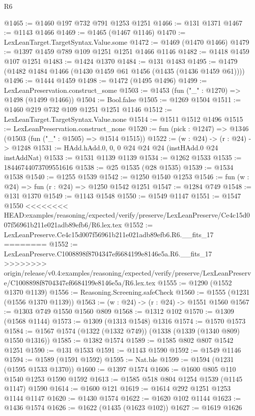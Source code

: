 \begin{lexlean}{R6}
\begin{coremodule}
{{{{{{{{{{{{{{{{{{{{{{{{{{{{{{{{{{{{{{{{{{{{{{{{{{{{{{{{{{{{{@1465 := @1460 @197 @732 @791 @1253 @1251
@1466 := @131 @1371
@1467 := @1143 @1466
@1469 := @1465 (@1467 @1146)
@1470 := LexLeanTarget.TargetSyntax.Value.some
@1472 := @1469 (@1470 @1466)
@1479 := @1397 @1459 @789 @109 @1251 @1251 @1466 @1146
@1482 := @1418 @1459 @107 @1251
@1483 := @1424 @1370
@1484 := @131 @1483
@1495 := @1479 (@1482 @1484 @1466 (@1430 @1459 @61 @1456 (@1435 (@1436 @1459 @61))))
@1496 := @1444 @1459
@1498 := @1472 (@1495 @1496)
@1499 := LexLeanPreservation.construct_some
@1503 := @1453 (fun ("_" : @1270) => @1498 (@1499 @1466))
@1504 := Bool.false
@1505 := @1269 @1504
@1511 := @1460 @219 @732 @109 @1251 @1251 @1146
@1512 := LexLeanTarget.TargetSyntax.Value.none
@1514 := @1511 @1512 @1496
@1515 := LexLeanPreservation.construct_none
@1520 := fun (pick : @1247) => @1346 (@1503 (fun ("_" : @1505) => @1514 @1515))
@1522 := (w : @24) -> (r : @24) -> @1248
@1531 := HAdd.hAdd.{0, 0, 0} @24 @24 @24 (instHAdd.{0} @24 instAddNat)
@1533 := @1531 @1139 @1139
@1534 := @1262 @1533
@1535 := 18446744073709551616
@1538 := @25 @1535 (@28 @1535)
@1539 := @1534 @1538
@1540 := @1255 @1539
@1542 := @1250 @1540 @1253
@1546 := fun (w : @24) => fun (r : @24) => @1250 @1542 @1251
@1547 := @1284 @749
@1548 := @131 @1370
@1549 := @1143 @1548
@1550 := @1549 @1147
@1551 := @1547 @1550
<<<<<<<< HEAD:examples/reasoning/expected/verify/preserve/LexLeanPreserve/Ce4c15d007f56961b211e021adb89efb6/R6.lex.tex
@1552 := LexLeanPreserve.Ce4c15d007f56961b211e021adb89efb6.R6.__fits_17
========
@1552 := LexLeanPreserve.C1008898f8704347ef6684199e8146e5a.R6.__fits_17
>>>>>>>> origin/release/v0.4:examples/reasoning/expected/verify/preserve/LexLeanPreserve/C1008898f8704347ef6684199e8146e5a/R6.lex.tex
@1555 := @1290 (@1552 @1370 @1139)
@1556 := Reasoning.Screening.safeCheck
@1560 := @1555 (@1231 (@1556 @1370 @1139))
@1563 := (w : @24) -> (r : @24) -> @1551 @1560
@1567 := @1303 @749 @1550 @1560 @809
@1568 := @1312 @102
@1570 := @1309 (@1568 @1144)
@1573 := @1309 (@1313 @1548) @1316
@1574 := @1570 @1573
@1584 := @1567 @1574 (@1322 (@1332 @749)) (@1338 (@1339 (@1340 @809) @1550 @1316))
@1585 := @1382 @1574
@1589 := @1585 @802 @807 @1542 @1251
@1590 := @131 @1533
@1591 := @1143 @1590
@1592 := @1549 @1146
@1594 := @1589 (@1591 @1592)
@1595 := Nat.ble
@1599 := @1594 (@1231 (@1595 @1533 @1370))
@1600 := @1397 @1574
@1606 := @1600 @805 @110 @1540 @1253 @1590 @1592
@1613 := @1585 @518 @804 @1254 @1539 (@1145 @1147) @1590
@1614 := @1600 @121
@1619 := @1614 @292 @1251 @1253 @1144 @1147
@1620 := @1430 @1574
@1622 := @1620 @102 @1144
@1623 := @1436 @1574
@1626 := @1622 (@1435 (@1623 @102))
@1627 := @1619 @1626
}}}}}}}}}}}}}}}}}}}}}}}}}}}}}}}}}}}}}}}}}}}}}}}}}}}}}}}}}}}}}
\end{coremodule}
\end{lexlean}
